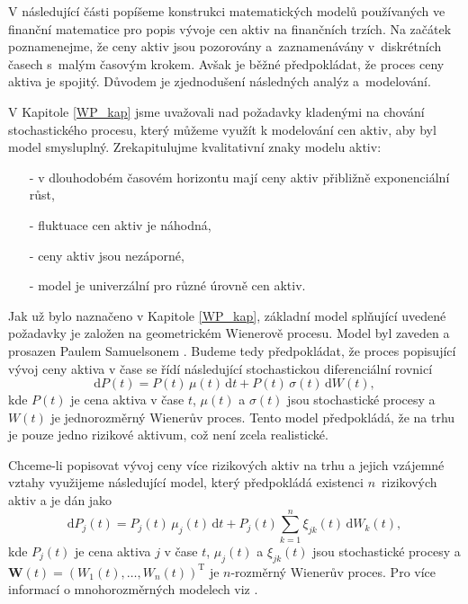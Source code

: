 \documentclass[a4paper,12pt]{report}
\theoremstyle{definition} \newtheorem{definice}[veta]{Definice}
\theoremstyle{remark}
\begin{document}

V následující části popíšeme konstrukci matematických modelů používaných ve finanční matematice pro popis vývoje cen aktiv na finančních trzích.
Na začátek poznamenejme, že ceny aktiv jsou pozorovány a~zaznamenávány v~diskrétních časech s~malým časovým krokem.
Avšak je běžné předpokládat, že proces ceny aktiva je spojitý.
Důvodem je zjednodušení následných analýz a~modelování.

V Kapitole \ref{WP_kap} jsme uvažovali nad požadavky kladenými na chování stochastického procesu, který můžeme využít k modelování cen aktiv, aby byl model smysluplný.
Zrekapitulujme kvalitativní znaky modelu aktiv:
\begin{itemize}
\item[-] v dlouhodobém časovém horizontu mají ceny aktiv přibližně exponenciální růst,
\item[-] fluktuace cen aktiv je náhodná,
\item[-] ceny aktiv jsou nezáporné,
\item[-] model je univerzální pro různé úrovně cen aktiv.
\end{itemize}
Jak už bylo naznačeno v Kapitole \ref{WP_kap}, základní model splňující uvedené požadavky je založen na geometrickém Wienerově procesu. 
Model byl zaveden a prosazen Paulem Samuelsonem \cite{samuelson1965proof}.
Budeme tedy předpokládat, že proces popisující vývoj ceny aktiva v čase se řídí následující stochastickou diferenciální rovnicí %
\begin{equation}\label{risk_asset_model}
\mathrm{d}P(t)=P(t)\,\mu(t)\,\mathrm{d}t+P(t)\,\sigma(t)\,\mathrm{d}W(t),
\end{equation}
kde $P(t)$ je cena aktiva v čase $t$, $\mu(t)$ a $\sigma(t)$ jsou stochastické procesy a $W(t)$  je jednorozměrný Wienerův proces.
Tento model předpokládá, že na trhu je pouze jedno rizikové aktivum, což není zcela realistické.

Chceme-li popisovat vývoj ceny více rizikových aktiv na trhu a jejich vzájemné vztahy využijeme následující model, který předpokládá existenci $n$~rizikových aktiv a je dán jako
\begin{equation}\label{multi_risk_asset_model}
\mathrm{d}P_j(t)=P_j(t)\,\mu_j(t)\,\mathrm{d}t+P_j(t)\sum_{k=1}^{n}\xi_{jk}(t)\,\mathrm{d}W_k(t),
\end{equation}
kde $P_j(t)$ je cena aktiva $j$ v čase $t$, $\mu_j(t)$ a $\xi_{jk}(t)$ jsou stochastické procesy a $\boldsymbol{W}(t)=(W_1(t),\dots,W_n(t))^\mathrm{T}$ je $n$-rozměrný Wienerův proces. 
Pro více informací o mnohorozměrných modelech viz \cite{etheridge2002course}.
\end{document}
